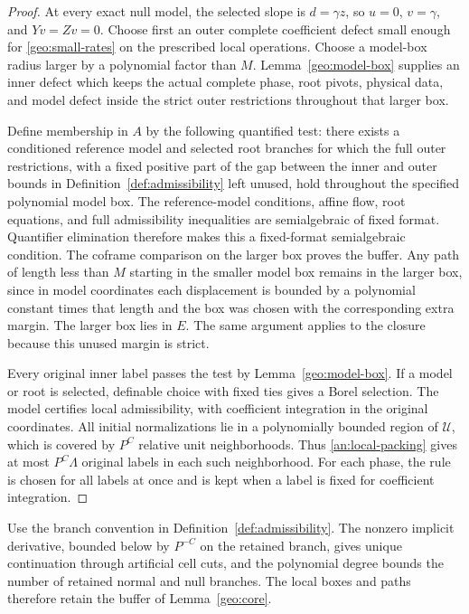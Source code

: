 \documentclass[11pt]{amsart}
\theoremstyle{definition}
\theoremstyle{remark}
\numberwithin{equation}{section}
\begin{document}
\begin{proof}
At every exact null model, the selected slope is $d=\gamma z$, so $u=0$, $v=\gamma$, and $Yv=Zv=0$. Choose first an outer complete coefficient defect small enough for \eqref{geo:small-rates} on the prescribed local operations. Choose a model-box radius larger by a polynomial factor than $M$. Lemma~\ref{geo:model-box} supplies an inner defect which keeps the actual complete phase, root pivots, physical data, and model defect inside the strict outer restrictions throughout that larger box.

Define membership in $A$ by the following quantified test: there exists a conditioned reference model and selected root branches for which the full outer restrictions, with a fixed positive part of the gap between the inner and outer bounds in Definition~\ref{def:admissibility} left unused, hold throughout the specified polynomial model box. The reference-model conditions, affine flow, root equations, and full admissibility inequalities are semialgebraic of fixed format. Quantifier elimination \cite[Theorems 2.77 and 14.16]{BPR} therefore makes this a fixed-format semialgebraic condition. The coframe comparison on the larger box proves the buffer. Any path of length less than $M$ starting in the smaller model box remains in the larger box, since in model coordinates each displacement is bounded by a polynomial constant times that length and the box was chosen with the corresponding extra margin. The larger box lies in $E$. The same argument applies to the closure because this unused margin is strict.

Every original inner label passes the test by Lemma~\ref{geo:model-box}. If a model or root is selected, definable choice with fixed ties gives a Borel selection. The model certifies local admissibility, with coefficient integration in the original coordinates. All initial normalizations lie in a polynomially bounded region of $\mathcal U$, which is covered by $P^C$ relative unit neighborhoods. Thus \eqref{an:local-packing} gives at most $P^C\Lambda$ original labels in each such neighborhood. For each phase, the rule is chosen for all labels at once and is kept when a label is fixed for coefficient integration.
\end{proof}

Use the branch convention in Definition~\ref{def:admissibility}. The nonzero implicit derivative, bounded below by $P^{-C}$ on the retained branch, gives unique continuation through artificial cell cuts, and the polynomial degree bounds the number of retained normal and null branches. The local boxes and paths therefore retain the buffer of Lemma~\ref{geo:core}.
\end{document}
